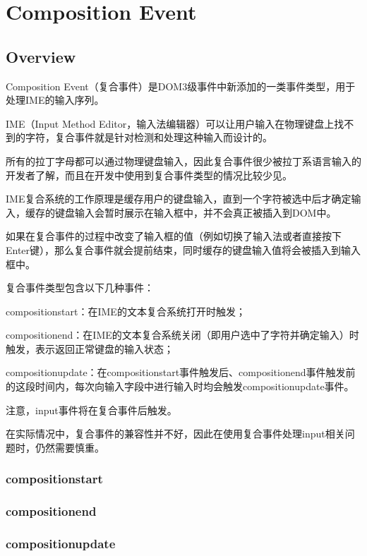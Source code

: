 \part{Composition Event}

\chapter{Overview}


Composition Event（复合事件）是DOM3级事件中新添加的一类事件类型，用于处理IME的输入序列。

IME（Input Method Editor，输入法编辑器）可以让用户输入在物理键盘上找不到的字符，复合事件就是针对检测和处理这种输入而设计的。

所有的拉丁字母都可以通过物理键盘输入，因此复合事件很少被拉丁系语言输入的开发者了解，而且在开发中使用到复合事件类型的情况比较少见。

IME复合系统的工作原理是缓存用户的键盘输入，直到一个字符被选中后才确定输入，缓存的键盘输入会暂时展示在输入框中，并不会真正被插入到DOM中。

如果在复合事件的过程中改变了输入框的值（例如切换了输入法或者直接按下Enter键），那么复合事件就会提前结束，同时缓存的键盘输入值将会被插入到输入框中。

复合事件类型包含以下几种事件：

\begin{compactitem}
\item compositionstart：在IME的文本复合系统打开时触发；
\item compositionend：在IME的文本复合系统关闭（即用户选中了字符并确定输入）时触发，表示返回正常键盘的输入状态；
\item compositionupdate：在compositionstart事件触发后、compositionend事件触发前的这段时间内，每次向输入字段中进行输入时均会触发compositionupdate事件。
\end{compactitem}

注意，input事件将在复合事件后触发。

在实际情况中，复合事件的兼容性并不好，因此在使用复合事件处理input相关问题时，仍然需要慎重。

\section{compositionstart}


\section{compositionend}


\section{compositionupdate}






